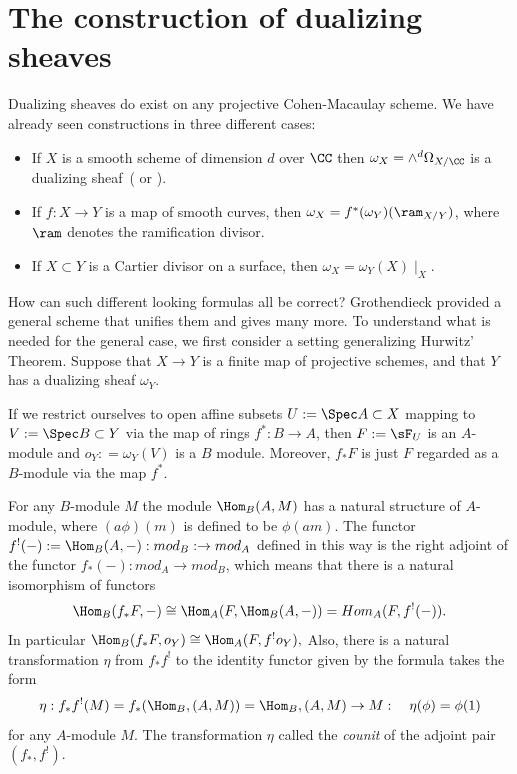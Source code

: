 \section{The construction of dualizing sheaves}\label{dualizing sheaves section}
Dualizing sheaves do exist on any projective Cohen-Macaulay scheme. We have already seen constructions
in three different cases:
\begin{itemize}
 \item If $X$ is a smooth scheme of dimension $d$ over $\CC$ then $\omega_{X}= \wedge^{d} \Omega_{X/\CC}$
is a dualizing sheaf~(\cite[Hartshorne[****]{Hartshorne1977} or  \cite[p. 648, 708]{Griffiths-Harris1978}). 
\item If $f: X\to Y$ is a map of smooth curves, then $\omega_{X} = f^{*}(\omega_{Y})(\ram_{X/Y})$, where
$\ram$ denotes the ramification divisor.
\item If $X\subset Y$ is a Cartier divisor on a surface, then $\omega_{X} = \omega_{Y}(X)\mid_{X}$.
\end{itemize}

How can such different looking formulas all be correct? Grothendieck provided a general scheme
that unifies them and gives many more. 
To understand what is needed for the general case, we first consider a setting generalizing Hurwitz' Theorem.
Suppose that $X\to Y$ is a finite map of projective schemes, and that $Y$ has a dualizing sheaf $\omega_{Y}$.

If we restrict ourselves to open affine subsets
$U := \Spec A\subset X$ mapping to $V:= \Spec B\subset Y$ via the map of rings $f^{*}:B\to A$, then 
$F := \sF_{U}$ is an $A$-module and $o_{Y}: = \omega_{Y}(V)$ is a $B$ module. Moreover,
$f_*{F}$ is just $F$ regarded as a $B$-module via the map $f^{*}$.

For any $B$-module $M$ the module $\Hom_{B}(A, M)$ has a natural structure of $A$-module,
where $(a\phi)(m)$ is defined to be $\phi(am)$. The functor $f^{!}(-) := \Hom_{B}(A, -): mod_{B}:\to mod_{A}$ 
defined in this way is the right adjoint of the functor $f_{*}(-): mod_{A}\to mod_{B}$, 
which means that there is a natural isomorphism of functors
$$
\Hom_{B}(f_{*}F, -) \cong \Hom_{A}(F, \Hom_{B}(A, -)) = Hom_{A}(F, f^{!}(-)).
$$
In particular 
$
\Hom_{B}(f_{*}F, o_{Y}) \cong \Hom_{A}(F, f^{!}o_{Y}),
$
Also, there is a natural transformation $\eta$ from $ f_{*}f^{!}$ to the identity functor given by the formula
takes the form
$$
\eta: f_{*}f^{!}(M) = f_{*}(\Hom_{B}, (A,M)) = \Hom_{B}, (A,M) \to M:\quad \eta(\phi) = \phi(1)
$$
for any $A$-module $M$. 
The transformation $\eta$ called the \emph{counit} of the adjoint pair $(f_{*}, f^{!})$.


